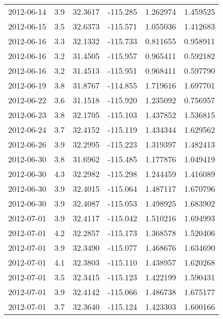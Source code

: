 \begin{tabular}{lrrrrr}
2012-06-14 &       3.9 &  32.3617 &  -115.285 &         1.262974 &         1.459525 \\
2012-06-15 &       3.5 &  32.6373 &  -115.571 &         1.055036 &         1.412683 \\
2012-06-16 &       3.3 &  32.1332 &  -115.733 &         0.811655 &         0.958911 \\
2012-06-16 &       3.2 &  31.4505 &  -115.957 &         0.965411 &         0.592182 \\
2012-06-16 &       3.2 &  31.4513 &  -115.951 &         0.968411 &         0.597790 \\
2012-06-19 &       3.8 &  31.8767 &  -114.855 &         1.719616 &         1.697701 \\
2012-06-22 &       3.6 &  31.1518 &  -115.920 &         1.235092 &         0.756957 \\
2012-06-23 &       3.8 &  32.1705 &  -115.103 &         1.437852 &         1.536815 \\
2012-06-24 &       3.7 &  32.4152 &  -115.119 &         1.434344 &         1.629562 \\
2012-06-26 &       3.9 &  32.2995 &  -115.223 &         1.319397 &         1.482413 \\
2012-06-30 &       3.8 &  31.6962 &  -115.485 &         1.177876 &         1.049419 \\
2012-06-30 &       4.3 &  32.2982 &  -115.298 &         1.244459 &         1.416089 \\
2012-06-30 &       3.9 &  32.4015 &  -115.064 &         1.487117 &         1.670796 \\
2012-06-30 &       3.9 &  32.4087 &  -115.053 &         1.498925 &         1.683902 \\
2012-07-01 &       3.9 &  32.4117 &  -115.042 &         1.510216 &         1.694993 \\
2012-07-01 &       4.2 &  32.2857 &  -115.173 &         1.368578 &         1.520406 \\
2012-07-01 &       3.9 &  32.3490 &  -115.077 &         1.468676 &         1.634690 \\
2012-07-01 &       4.1 &  32.3803 &  -115.110 &         1.438957 &         1.620268 \\
2012-07-01 &       3.5 &  32.3415 &  -115.123 &         1.422199 &         1.590431 \\
2012-07-01 &       3.9 &  32.4142 &  -115.066 &         1.486738 &         1.675177 \\
2012-07-01 &       3.7 &  32.3640 &  -115.124 &         1.423303 &         1.600166 \\

\end{tabular}
